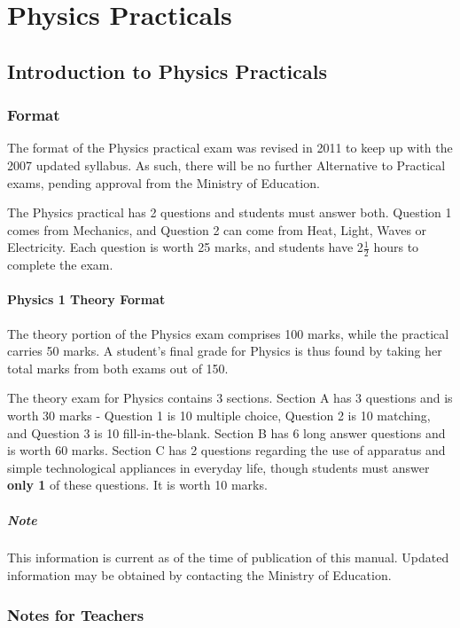 \chapter{Physics Practicals} 

\section{Introduction to Physics Practicals}

\subsection{Format}
The format of the Physics practical exam was revised in 2011 to keep up with the 2007 updated syllabus. As such, there will be no further Alternative to Practical exams, pending approval from the Ministry of Education.

The Physics practical has 2 questions and students must answer both. Question 1 comes from Mechanics, and Question 2 can come from Heat, Light, Waves or Electricity. Each question is worth 25 marks, and students have 2$\frac{1}{2}$ hours to complete the exam.

\subsubsection{Physics 1 Theory Format}
The theory portion of the Physics exam comprises 100 marks, while the practical carries 50 marks. A student's final grade for Physics is thus found by taking her total marks from both exams out of 150.

The theory exam for Physics contains 3 sections. Section A has 3 questions and is worth 30 marks - Question 1 is 10 multiple choice, Question 2 is 10 matching, and Question 3 is 10 fill-in-the-blank. Section B has 6 long answer questions and is worth 60 marks. Section C has 2 questions regarding the use of apparatus and simple technological appliances in everyday life, though students must answer \textbf{only 1} of these questions. It is worth 10 marks.

\paragraph{Note} This information is current as of the time of publication of this manual. Updated information may be obtained by contacting the Ministry of Education. 

\subsection{Notes for Teachers}

